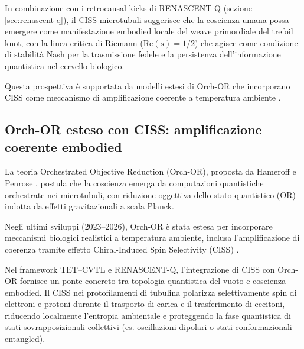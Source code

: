 \documentclass[11pt,a4paper]{article}
\let\oldcite\cite
\renewcommand{\cite}{\protect\oldcite}
\let\oldref\ref
\renewcommand{\ref}{\protect\oldref}
\theoremstyle{plain}
\theoremstyle{definition}
\begin{document}
\vspace{0.3cm}

In combinazione con i retrocausal kicks di RENASCENT-Q (sezione \ref{sec:renascent-q}), il CISS-microtubuli suggerisce che la coscienza umana possa emergere come manifestazione embodied locale del weave primordiale del trefoil knot, con la linea critica di Riemann ($\mathrm{Re}(s) = 1/2$) che agisce come condizione di stabilità Nash per la trasmissione fedele e la persistenza dell'informazione quantistica nel cervello biologico. 


\vspace{0.3cm}

Questa prospettiva è supportata da modelli estesi di Orch-OR che incorporano CISS come meccanismo di amplificazione coerente a temperatura ambiente \cite{hameroff2023orch, hameroff2025microtubule-ciss, escolag2025entangled}.


\vspace{0.5cm}






\subsection{Orch-OR esteso con CISS: amplificazione coerente embodied}

La teoria Orchestrated Objective Reduction (Orch-OR), proposta da Hameroff e Penrose \cite{hameroff2014consciousness, hameroff2023orch}, postula che la coscienza emerga da computazioni quantistiche orchestrate nei microtubuli, con riduzione oggettiva dello stato quantistico (OR) indotta da effetti gravitazionali a scala Planck. 

\vspace{0.3cm}

Negli ultimi sviluppi (2023–2026), Orch-OR è stata estesa per incorporare meccanismi biologici realistici a temperatura ambiente, inclusa l'amplificazione di coerenza tramite effetto Chiral-Induced Spin Selectivity (CISS) \cite{hameroff2025microtubule-ciss, escolag2025entangled}.

\vspace{0.4cm}

Nel framework TET--CVTL e RENASCENT-Q, l'integrazione di CISS con Orch-OR fornisce un ponte concreto tra topologia quantistica del vuoto e coscienza embodied. Il CISS nei protofilamenti di tubulina polarizza selettivamente spin di elettroni e protoni durante il trasporto di carica e il trasferimento di eccitoni, riducendo localmente l'entropia ambientale e proteggendo la fase quantistica di stati sovrapposizionali collettivi (es. oscillazioni dipolari o stati conformazionali entangled). 
\end{document}
